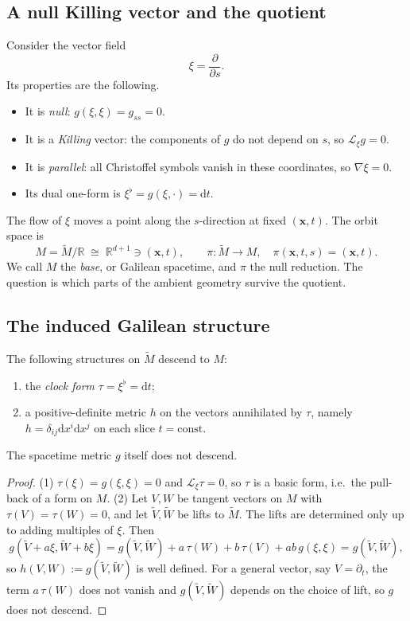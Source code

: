 \subsection{A null Killing vector and the quotient}

Consider the vector field
\begin{equation}
  \xi=\frac{\partial}{\partial s}.
  \label{nr:xi}
\end{equation}
Its properties are the following.
\begin{itemize}
\item It is \emph{null}: $g(\xi,\xi)=g_{ss}=0$.
\item It is a \emph{Killing} vector: the components of $g$ do not depend on $s$,
      so $\mathcal{L}_\xi g=0$.
\item It is \emph{parallel}: all Christoffel symbols vanish in these
      coordinates, so $\nabla\xi=0$.
\item Its dual one-form is $\xi^\flat=g(\xi,\cdot)=\mathrm{d}t$.
\end{itemize}
The flow of $\xi$ moves a point along the $s$-direction at fixed $(\mathbf{x},t)$.
The orbit space is
\begin{equation}
  M=\tilde M/\mathbb{R}\;\cong\;\mathbb{R}^{d+1}\ni(\mathbf{x},t),\qquad
  \pi:\tilde M\to M,\quad \pi(\mathbf{x},t,s)=(\mathbf{x},t).
  \label{nr:quotient}
\end{equation}
We call $M$ the \emph{base}, or Galilean spacetime, and $\pi$ the null
reduction. The question is which parts of the ambient geometry survive the
quotient.

\subsection{The induced Galilean structure}

\begin{nrprop}\label{nr:prop-induced}
The following structures on $\tilde M$ descend to $M$:
\begin{enumerate}
\item the \emph{clock form} $\tau=\xi^\flat=\mathrm{d}t$;
\item a positive-definite metric $h$ on the vectors annihilated by $\tau$,
      namely $h=\delta_{ij}\mathrm{d}x^i\mathrm{d}x^j$ on each slice $t=\text{const}$.
\end{enumerate}
The spacetime metric $g$ itself does not descend.
\end{nrprop}
\begin{proof}
(1) $\tau(\xi)=g(\xi,\xi)=0$ and $\mathcal{L}_\xi\tau=0$, so $\tau$ is a basic
form, i.e.\ the pull-back of a form on $M$.
(2) Let $V,W$ be tangent vectors on $M$ with $\tau(V)=\tau(W)=0$, and let
$\tilde V,\tilde W$ be lifts to $\tilde M$. The lifts are determined only up to
adding multiples of $\xi$. Then
\[
  g(\tilde V+a\xi,\tilde W+b\xi)
  =g(\tilde V,\tilde W)+a\,\tau(W)+b\,\tau(V)+ab\,g(\xi,\xi)
  =g(\tilde V,\tilde W),
\]
so $h(V,W):=g(\tilde V,\tilde W)$ is well defined. For a general vector, say
$V=\partial_t$, the term $a\,\tau(W)$ does not vanish and $g(\tilde V,\tilde W)$
depends on the choice of lift, so $g$ does not descend.
\end{proof}

